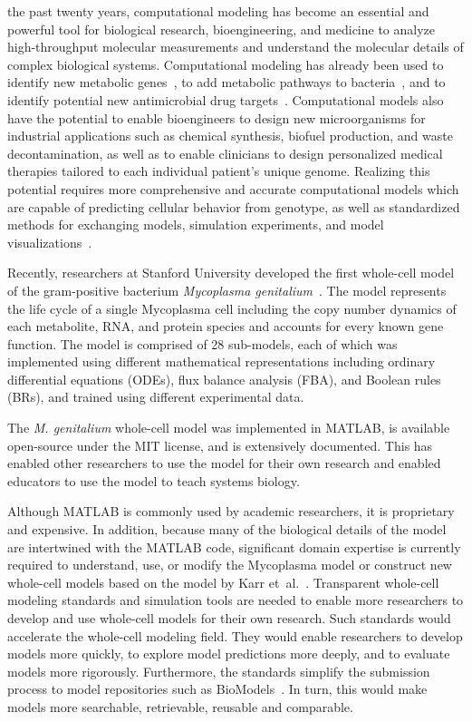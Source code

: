 \documentclass[journal,transmag]{IEEEtran}
\begin{document}
 the past twenty years, computational modeling has become an essential and powerful tool for biological research, bioengineering, and medicine to analyze high-throughput molecular measurements and understand the molecular details of complex biological systems. 
Computational modeling has already been used to identify new metabolic genes~\cite{Reed2006}, to add metabolic pathways to bacteria~\cite{Lee2012}, and to identify potential new antimicrobial drug targets~\cite{Lee2009}. 
Computational models also have the potential to enable bioengineers to design new microorganisms for industrial applications such as chemical synthesis, biofuel production, and waste decontamination, as well as to enable clinicians to design personalized medical therapies tailored to each individual patient's unique genome. 
Realizing this potential requires more comprehensive and accurate computational models which are capable of predicting cellular behavior from genotype, as well as standardized methods for exchanging models, simulation experiments, and model visualizations~\cite{Macklin2014,Karr2015,hucka2015promoting,Klipp07}.

Recently, researchers at Stanford University developed the first whole-cell model of the gram-positive bacterium \textit{Mycoplasma genitalium}~\cite{Karr2012}. 
The model represents the life cycle of a single Mycoplasma cell including the copy number dynamics of each metabolite, RNA, and protein species and accounts for every known gene function. 
The model is comprised of 28 sub-models, each of which was implemented using different mathematical representations including ordinary differential equations (ODEs), flux balance analysis (FBA), and Boolean rules (BRs), and trained using different experimental data. 

The \textit{M. genitalium} whole-cell model was implemented in MATLAB, is available open-source under the MIT license, and is extensively documented. 
This has enabled other researchers to use the model for their own research and enabled educators to use the model to teach systems biology. 

Although MATLAB is commonly used by academic researchers, it is proprietary and expensive. In addition, because many of the biological details of the model are intertwined with the MATLAB code, significant domain expertise is currently required to understand, use, or modify the Mycoplasma model or construct new whole-cell models based on the model by Karr et~al.~\cite{Karr2012}. 
Transparent whole-cell modeling standards and simulation tools are needed to enable more researchers to develop and use whole-cell models for their own research. 
Such standards would accelerate the whole-cell modeling field.
They would enable researchers to develop models more quickly, to explore model predictions more deeply, and to evaluate models more rigorously.
Furthermore, the standards simplify the submission process to model repositories such as BioModels~\cite{li2010biomodels}.
In turn, this would make models more searchable, retrievable, reusable and comparable.
\end{document}
